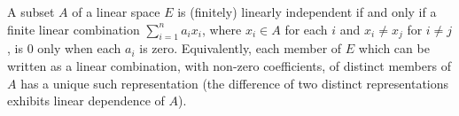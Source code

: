 A subset $A$ of a linear space $E$ is (finitely) linearly independent if and only if a finite linear combination $\sum_{i=1}^{n} a_i x_i$, where $x_i \in A$ for each $i$ and $x_i \neq x_j$ for $i \neq j$, is $0$ only when each $a_i$ is zero. Equivalently, each member of $E$ which can be written as a linear combination, with non-zero coefficients, of distinct members of $A$ has a unique such representation (the difference of two distinct representations exhibits linear dependence of $A$).
